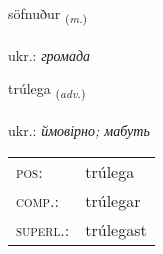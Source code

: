 \documentclass[frontgrid, backgrid]{flacards}\usepackage[]{graphicx}\usepackage[]{xcolor}
\begin{document}
\renewcommand{\flhead}{\vskip5pt \fboxsep=0pt {\small\bfseries\footnotesize Nafnorð | іменник}}
\renewcommand{\fcfoot}{\vskip5pt \fboxsep=0pt \hspace{2pt}{\small\bfseries\footnotesize 3K}}

\renewcommand{\blhead}{\vskip5pt {\small\bfseries\footnotesize Nafnorð | іменник }}
\renewcommand{\bcfoot}{\vskip5pt \hspace{2pt}{\small\bfseries\footnotesize 3K}}


{söfnuður \small{\textsubscript{(\textit{m.})}} \\[1ex] %
\textphonetic{[sœpnʏðʏr]} \\
ukr.: \emph{громада} \\  [2ex]
\renewcommand*{\arraystretch}{0.8}
}

\renewcommand{\flhead}{\vskip5pt \fboxsep=0pt {\small\bfseries\footnotesize Atviksorð | прислівник}}
\renewcommand{\fcfoot}{\vskip5pt \fboxsep=0pt \hspace{2pt}{\small\bfseries\footnotesize 3K}}

\renewcommand{\blhead}{\vskip5pt {\small\bfseries\footnotesize Atviksorð | прислівник }}
\renewcommand{\bcfoot}{\vskip5pt \hspace{2pt}{\small\bfseries\footnotesize 3K}}


{trúlega \small{\textsubscript{(\textit{adv.})}} \\[1ex] %
\textphonetic{[tʰruːlɛɣa]} \\
ukr.: \emph{ймовірно; мабуть} \\  [2ex]
\renewcommand*{\arraystretch}{0.8}
\begin{tabular}{ll}
\textsc{pos}: & trúlega \\ 
\textsc{comp.}: & trúlegar \\ 
\textsc{superl.}: & trúlegast \\
\end{tabular}
}
\end{document}
